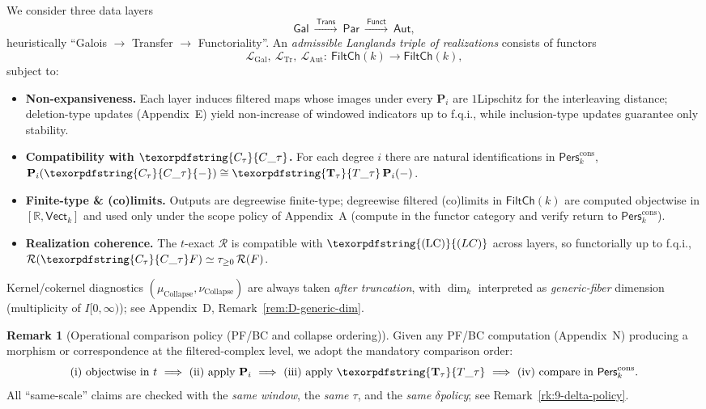 \documentclass[11pt]{article}
\numberwithin{equation}{section}
\theoremstyle{plain}
\theoremstyle{definition}
\theoremstyle{remark}
\DeclareRobustCommand{\hyp}{\nobreakdash-}
\newcommand{\Pers}{\mathsf{Pers}}
\newcommand{\Rfun}{\mathcal{R}}
\theoremstyle{plain}
\theoremstyle{definition}
\numberwithin{equation}{section}
\theoremstyle{definition}
\newtheorem{remark}[theorem]{Remark}
\DeclareRobustCommand{\FiltCh}[1]{\mathsf{FiltCh}(#1)}
\DeclareRobustCommand{\Perskft}{\Pers^{\mathrm{cons}}_{k}}
\DeclareRobustCommand{\Ttau}{\texorpdfstring{\ensuremath{\mathbf{T}_{\tau}}}{T\_\tau}}
\DeclareRobustCommand{\Ctau}{\texorpdfstring{\ensuremath{C_{\tau}}}{C\_\tau}}
\DeclareRobustCommand{\LC}{\texorpdfstring{\ensuremath{\mathrm{(LC)}}}{(LC)}}
\numberwithin{equation}{section}
\theoremstyle{plain}
\theoremstyle{definition}
\theoremstyle{remark}
\providecommand{\Cfun}[1]{\mathsf{C}_{#1}}
\providecommand{\Tfun}[1]{\mathbf{T}_{#1}}
\providecommand{\Ctau}{\Cfun{\tau}}
\providecommand{\Ttau}{\Tfun{\tau}}
\begin{document}
We consider three data layers
\[
\mathsf{Gal}\ \xrightarrow{\ \mathsf{Trans}\ }\ \mathsf{Par}\ \xrightarrow{\ \mathsf{Funct}\ }\ \mathsf{Aut},
\]
heuristically “Galois \(\to\) Transfer \(\to\) Functoriality”.
An \emph{admissible Langlands triple of realizations} consists of functors
\[
\mathcal{L}_{\mathrm{Gal}},\ \mathcal{L}_{\mathrm{Tr}},\ \mathcal{L}_{\mathrm{Aut}}:\ \FiltCh{k}\longrightarrow\FiltCh{k},
\]
subject to:
\begin{itemize}
  \item \textbf{Non\hyp expansiveness.} Each layer induces filtered maps whose images under every \(\mathbf{P}_i\) are \(1\)\nobreakdash Lipschitz for the interleaving distance; deletion\hyp type updates (Appendix~E) yield non\hyp increase of windowed indicators up to f.q.i., while inclusion\hyp type updates guarantee only stability.
  \item \textbf{Compatibility with \(\Ctau\).} For each degree \(i\) there are natural identifications in \(\Perskft\),
  \(\mathbf{P}_i(\Ctau{-})\cong \Ttau\,\mathbf{P}_i(-)\).
  \item \textbf{Finite\hyp type \& (co)limits.} Outputs are degreewise finite\hyp type; degreewise filtered (co)limits in \(\FiltCh{k}\) are computed objectwise in \([\mathbb{R},\mathsf{Vect}_k]\) and used only under the scope policy of Appendix~A (compute in the functor category and verify return to \(\Pers^{\mathrm{cons}}_k\)).
  \item \textbf{Realization coherence.} The \(t\)\hyp exact \(\Rfun\) is compatible with \(\LC\) across layers, so functorially up to f.q.i.,
  \(\Rfun(\Ctau F)\simeq \tau_{\ge 0}\,\Rfun(F)\).
\end{itemize}
Kernel/cokernel diagnostics \((\mu_{\mathrm{Collapse}},\nu_{\mathrm{Collapse}})\) are always taken \emph{after truncation}, with \(\dim_k\) interpreted as \emph{generic\hyp fiber} dimension (multiplicity of \(I[0,\infty)\)); see Appendix~D, Remark~\ref{rem:D-generic-dim}.

\begin{remark}[Operational comparison policy (PF/BC and collapse ordering)]\label{rk:9-operational}
Given any PF/BC computation (Appendix~N) producing a morphism or correspondence at the filtered\hyp complex level, we adopt the mandatory comparison order:
\[
\text{(i) objectwise in \(t\)}\ \Longrightarrow\ \text{(ii) apply }\mathbf{P}_i\ \Longrightarrow\ \text{(iii) apply }\Ttau\ \Longrightarrow\ \text{(iv) compare in }\Perskft.
\]
All “same\hyp scale” claims are checked with the \emph{same window}, the \emph{same \(\tau\)}, and the \emph{same \(\delta\)\nobreakdash policy}; see Remark~\ref{rk:9-delta-policy}.
\end{remark}
\end{document}
